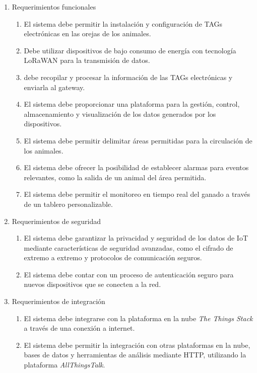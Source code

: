 \documentclass[
11pt, %
]{charter}
\begin{document}
\begin{enumerate}
	\item Requerimientos funcionales
		\begin{enumerate}
			\item El sistema debe permitir la instalación y configuración de TAGs electrónicas en las orejas de los animales.
			\item Debe utilizar dispositivos de bajo consumo de energía con tecnología LoRaWAN para la transmisión de datos.
			\item debe recopilar y procesar la información de las TAGs electrónicas y enviarla al gateway.
			\item El sistema debe proporcionar una plataforma para la gestión, control, almacenamiento y visualización de los datos generados por los dispositivos.
			\item El sistema debe permitir delimitar áreas permitidas para la circulación de los animales.
			\item El sistema debe ofrecer la posibilidad de establecer alarmas para eventos relevantes, como la salida de un animal del área permitida.
			\item El sistema debe permitir el monitoreo en tiempo real del ganado a través de un tablero personalizable.
		\end{enumerate}
	\item Requerimientos de seguridad
		\begin{enumerate}
			\item El sistema debe garantizar la privacidad y seguridad de los datos de IoT mediante características de seguridad avanzadas, como el cifrado de extremo a extremo y protocolos de comunicación seguros.
			\item El sistema debe contar con un proceso de autenticación seguro para nuevos dispositivos que se conecten a la red.
		\end{enumerate}
		
	\item Requerimientos de integración
		\begin{enumerate}
			\item El sistema debe integrarse con la plataforma en la nube \emph{The Things Stack} a través de una conexión a internet.
			\item El sistema debe permitir la integración con otras plataformas en la nube, bases de datos y herramientas de análisis mediante HTTP, utilizando la plataforma \emph{AllThingsTalk}.
		\end{enumerate}
		

\end{enumerate}
\end{document}
